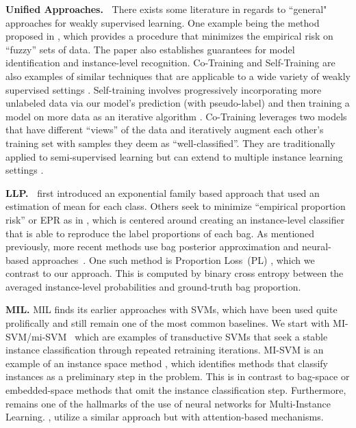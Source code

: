 \documentclass{article}
\begin{document}
\textbf{Unified Approaches.\ } There exists some literature in regards to ``general" approaches for weakly supervised learning. One example being the method proposed in \citet{hullermeier2014learning}, which provides a procedure that minimizes the empirical risk on ``fuzzy'' sets of data. The paper also establishes guarantees for model identification and instance-level recognition. Co-Training and Self-Training are also examples of similar techniques that are applicable to a wide variety of weakly supervised settings \cite{cotraining1998, unsupervisedsup1995}. Self-training involves progressively incorporating more unlabeled data via our model’s prediction (with pseudo-label) and then training a model on more data as an iterative algorithm \cite{karamanolakis2021self}. Co-Training leverages two models that have different “views” of the data and iteratively augment each other's training set with samples they deem as “well-classified”. They are traditionally applied to semi-supervised learning but can extend to multiple instance learning settings \cite{cotraining2011lu, xu2013survey, liu2023multiple}.

\textbf{LLP.\ }
\citet{quadrianto2008llp} first introduced an exponential family based approach that used an estimation of mean for each class. Others seek to minimize ``empirical proportion risk'' or EPR as in \citet{yu2014learning}, which is centered around creating an instance-level classifier that is able to reproduce the label proportions of each bag. 
As mentioned previously, more recent methods use bag posterior approximation and neural-based approaches~\citep{ardehaly2017co, tsai2020learning}. One such method is Proportion Loss~(PL) \citep{tsai2020learning}, which we contrast to our approach. This is computed by binary cross entropy between the averaged instance-level probabilities and ground-truth bag proportion.



\textbf{MIL.}
MIL finds its earlier approaches with SVMs, which have been used quite prolifically and still remain one of the most common baselines. We start with MI-SVM/mi-SVM~\citep{Andrews2002SupportVM} which are examples of transductive SVMs \citep{carbonneau2018multiple} that seek a stable instance classification through repeated retraining iterations. MI-SVM is an example of an instance space method \citep{carbonneau2018multiple}, which identifies methods that classify instances as a preliminary step in the problem. This is in contrast to bag-space or embedded-space methods that omit the instance classification step. Furthermore, \citet{wang2018revisiting} remains one of the hallmarks of the use of neural networks for Multi-Instance Learning. \citet{ilse2018attention}, utilize a similar approach but with attention-based mechanisms.
\end{document}
